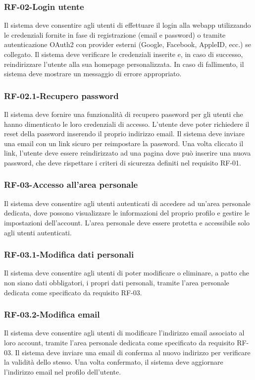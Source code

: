 \subsubsection*{RF-02-Login utente}
Il sistema deve consentire agli utenti di effettuare il login alla webapp utilizzando le credenziali fornite in fase di registrazione (email e password) o tramite autenticazione OAuth2 con provider esterni (Google, Facebook, AppleID, ecc.) se collegato. Il sistema deve verificare le credenziali inserite e, in caso di successo, reindirizzare l'utente alla sua homepage personalizzata. In caso di fallimento, il sistema deve mostrare un messaggio di errore appropriato.
\subsubsection*{RF-02.1-Recupero password}
Il sistema deve fornire una funzionalità di recupero password per gli utenti che hanno dimenticato le loro credenziali di accesso. L'utente deve poter richiedere il reset della password inserendo il proprio indirizzo email. Il sistema deve inviare una email con un link sicuro per reimpostare la password. Una volta cliccato il link, l'utente deve essere reindirizzato ad una pagina dove può inserire una nuova password, che deve rispettare i criteri di sicurezza definiti nel requisito RF-01.
\subsubsection*{RF-03-Accesso all'area personale}
Il sistema deve consentire agli utenti autenticati di accedere ad un'area personale dedicata, dove possono visualizzare le informazioni del proprio profilo e gestire le impostazioni dell'account. L'area personale deve essere protetta e accessibile solo agli utenti autenticati.
\subsubsection*{RF-03.1-Modifica dati personali}
Il sistema deve consentire agli utenti di poter modificare o eliminare, a patto che non siano dati obbligatori, i propri dati personali, tramite l'area personale dedicata come specificato da requisito RF-03.
\subsubsection*{RF-03.2-Modifica email}
Il sistema deve consentire agli utenti di modificare l'indirizzo email associato al loro account, tramite l'area personale dedicata come specificato da requisito RF-03. Il sistema deve inviare una email di conferma al nuovo indirizzo per verificare la validità dello stesso. Una volta confermato, il sistema deve aggiornare l'indirizzo email nel profilo dell'utente.
